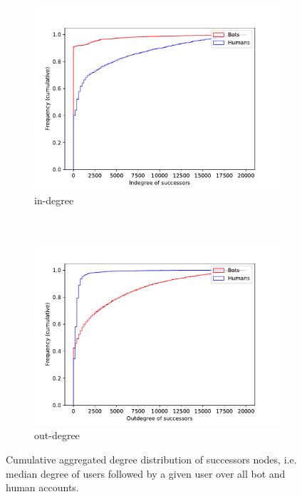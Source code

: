 \begin{figure}[t!]
    \centering
    \begin{subfigure}[t]{0.5\textwidth}
        \centering
        \includegraphics[width=\textwidth]{paper/FIG/indegree_succ.pdf}
        \caption{in-degree}
    \end{subfigure}%
    ~ 
    \begin{subfigure}[t]{0.5\textwidth}
        \centering
        \includegraphics[width=\textwidth]{paper/FIG/outdegree_succ.pdf}
        \caption{out-degree}
    \end{subfigure}
    \caption{Cumulative aggregated degree distribution of successors nodes, i.e. median degree of users followed by a given user over all bot and human accounts.}
    \label{fig:cum_degrees_successors}
\end{figure}


